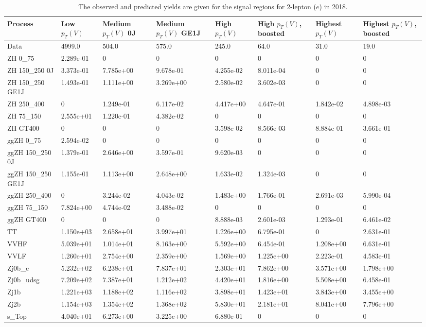 \begin{table}
\centering
\caption[2018 2-lepton ($e$) signal selection yields]{
                  The observed and predicted yields are given for the
                  signal regions for 2-lepton ($e$) in 2018.
                  }
{\footnotesize
\begin{tabularx}{\textwidth}{|X|X|X|X|X|X|X|X|}
\hline
Process & Low $p_{T}(V)$ & Medium $p_{T}(V)$ 0J & Medium $p_{T}(V)$ GE1J & High $p_{T}(V)$ & High $p_{T}(V)$, boosted & Highest $p_{T}(V)$ & Highest $p_{T}(V)$, boosted \\
\hline
Data & 4999.0 & 504.0 & 575.0 & 245.0 & 64.0 & 31.0 & 19.0 \\
\hline
ZH 0\_75 & 2.289e-01 & 0 & 0 & 0 & 0 & 0 & 0 \\
ZH 150\_250 0J & 3.373e-01 & 7.785e+00 & 9.678e-01 & 4.255e-02 & 8.011e-04 & 0 & 0 \\
ZH 150\_250 GE1J & 1.493e-01 & 1.111e+00 & 3.269e+00 & 2.580e-02 & 3.602e-03 & 0 & 0 \\
ZH 250\_400 & 0 & 1.249e-01 & 6.117e-02 & 4.417e+00 & 4.647e-01 & 1.842e-02 & 4.898e-03 \\
ZH 75\_150 & 2.555e+01 & 1.220e-01 & 4.382e-02 & 0 & 0 & 0 & 0 \\
ZH GT400 & 0 & 0 & 0 & 3.598e-02 & 8.566e-03 & 8.884e-01 & 3.661e-01 \\
ggZH 0\_75 & 2.594e-02 & 0 & 0 & 0 & 0 & 0 & 0 \\
ggZH 150\_250 0J & 1.379e-01 & 2.646e+00 & 3.597e-01 & 9.620e-03 & 0 & 0 & 0 \\
ggZH 150\_250 GE1J & 1.155e-01 & 1.113e+00 & 2.648e+00 & 1.633e-02 & 1.324e-03 & 0 & 0 \\
ggZH 250\_400 & 0 & 3.244e-02 & 4.043e-02 & 1.483e+00 & 1.766e-01 & 2.691e-03 & 5.990e-04 \\
ggZH 75\_150 & 7.824e+00 & 4.744e-02 & 3.488e-02 & 0 & 0 & 0 & 0 \\
ggZH GT400 & 0 & 0 & 0 & 8.888e-03 & 2.601e-03 & 1.293e-01 & 6.461e-02 \\
\hline
TT & 1.150e+03 & 2.658e+01 & 3.997e+01 & 1.226e+00 & 6.795e-01 & 0 & 2.631e-01 \\
VVHF & 5.039e+01 & 1.014e+01 & 8.163e+00 & 5.592e+00 & 6.454e-01 & 1.208e+00 & 6.631e-01 \\
VVLF & 1.260e+01 & 2.754e+00 & 2.359e+00 & 1.569e+00 & 1.225e+00 & 2.223e-01 & 4.583e-01 \\
Zj0b\_c & 5.232e+02 & 6.238e+01 & 7.837e+01 & 2.303e+01 & 7.862e+00 & 3.571e+00 & 1.798e+00 \\
Zj0b\_udsg & 7.209e+02 & 7.387e+01 & 1.212e+02 & 4.420e+01 & 1.816e+00 & 5.508e+00 & 6.458e-01 \\
Zj1b & 1.221e+03 & 1.188e+02 & 1.116e+02 & 3.898e+01 & 1.423e+01 & 3.843e+00 & 3.455e+00 \\
Zj2b & 1.154e+03 & 1.354e+02 & 1.368e+02 & 5.830e+01 & 2.181e+01 & 8.041e+00 & 7.796e+00 \\
s\_Top & 4.040e+01 & 6.273e+00 & 3.225e+00 & 6.880e-01 & 0 & 0 & 0 \\
\hline
\end{tabularx}
}
\label{tab:sr-Zee-2018}
\end{table}

